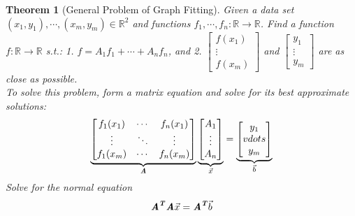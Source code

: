 \documentclass[12pt, a4paper]{article}
\newtheorem{thm}{Theorem}[subsection]
\def\R{{\mathbb{R}}}
\def\T{{\textbf{\emph{T}}}}
\def\vecx{\vec{x}}
\def\vecb{\vec{b}}
\def\matrixA{\textbf{\emph{A}}}
\begin{document}
\begin{thm}[General Problem of Graph Fitting] 
	Given a data set $(x_1,y_1),\cdots,(x_m,y_m)\in\R^2$ and functions $f_1,\cdots,f_n:\R\to\R$. Find a function $f:\R\to\R$ \emph{s.t.}: 1. $f=A_1f_1+\cdots+A_nf_n$, and 2. $\begin{bmatrix}f(x_1)\\\vdots\\f(x_m)\end{bmatrix}$ and $\begin{bmatrix}y_1\\\vdots\\y_m\end{bmatrix}$ are as close as possible.\\
	To solve this problem, form a matrix equation and solve for its best approximate solutions: 
	\[\underbrace{\begin{bmatrix}f_1(x_1)&\cdots&f_n(x_1)\\\vdots&\ddots&\vdots\\f_1(x_m)&\cdots&f_n(x_m)\end{bmatrix}}_{\matrixA}\underbrace{\begin{bmatrix}A_1\\\vdots\\A_n\end{bmatrix}}_{\vecx}=\underbrace{\begin{bmatrix}y_1\\vdots\\y_m\end{bmatrix}}_{\vecb}\]	
	Solve for the normal equation \[\matrixA^\T\matrixA\vecx=\matrixA^\T\vecb\]
\end{thm}
\end{document}
